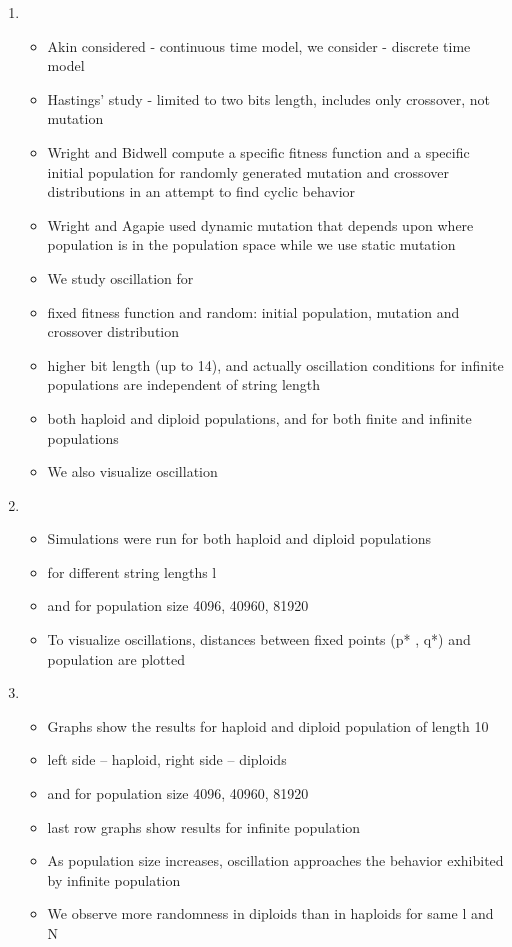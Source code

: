 \documentclass{article}
\begin{document}
\begin{enumerate}
    
\item
  \begin{itemize}
  \item Akin considered - continuous time model, we consider -
    discrete time model
   \item Hastings' study - limited to two bits length, includes only
     crossover, not mutation
  \item Wright and Bidwell compute a specific fitness function and a
    specific initial population for randomly generated mutation and
    crossover distributions in an attempt to find cyclic behavior
  \item Wright and Agapie used dynamic mutation that depends upon
    where population is in the population space while we use static
    mutation
  \item We study oscillation for
  \item fixed fitness function and random: initial population,
    mutation and crossover distribution
  \item higher bit length (up to 14), and actually oscillation
    conditions for infinite populations are independent of string
    length
  \item both haploid and diploid populations, and for both finite and
    infinite populations
  \item We also visualize oscillation
  \end{itemize}

\item
  \begin{itemize}
  \item Simulations were run for both haploid and diploid populations
  \item for different string lengths l
  \item and for population size {4096, 40960, 81920}
  \item To visualize oscillations, distances between fixed points (p*
    , q*) and population are plotted
  \end{itemize}
    
\item
  \begin{itemize}
  \item Graphs show the results for haploid and diploid population of
    length 10
   \item left side – haploid, right side – diploids
  \item and for population size {4096, 40960, 81920}
  \item last row graphs show results for infinite population
  \item As population size increases, oscillation approaches the
    behavior exhibited by infinite population
  \item We observe more randomness in diploids than in haploids for
    same l and N
  \end{itemize}
    

\end{enumerate}
\end{document}
